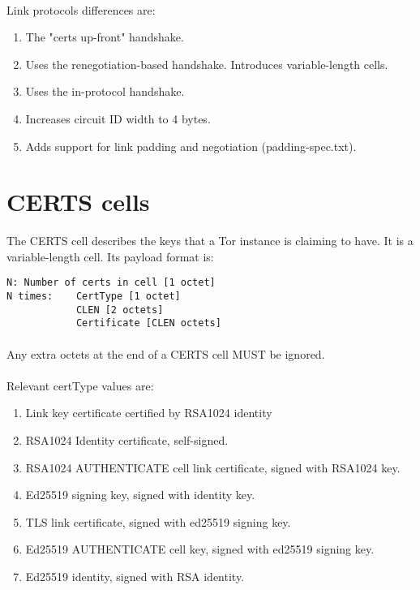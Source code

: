 \paragraph{}
Link protocols differences are:
\begin{enumerate}
    \item The "certs up-front" handshake.
    \item Uses the renegotiation-based handshake. Introduces
          variable-length cells.
    \item Uses the in-protocol handshake.
    \item Increases circuit ID width to 4 bytes.
    \item Adds support for link padding and negotiation (padding-spec.txt).
\end{enumerate}


\section{CERTS cells}
The CERTS cell describes the keys that a Tor instance is claiming
to have. It is a variable-length cell. Its payload format is:

\begin{verbatim}
N: Number of certs in cell [1 octet]
N times:    CertType [1 octet]
            CLEN [2 octets]
            Certificate [CLEN octets]
\end{verbatim}

\paragraph{}
Any extra octets at the end of a CERTS cell MUST be ignored.

\paragraph{}
Relevant certType values are:
\begin{enumerate}
    \item Link key certificate certified by RSA1024 identity
    \item RSA1024 Identity certificate, self-signed.
    \item RSA1024 AUTHENTICATE cell link certificate, signed with RSA1024 key.
    \item Ed25519 signing key, signed with identity key.
    \item TLS link certificate, signed with ed25519 signing key.
    \item Ed25519 AUTHENTICATE cell key, signed with ed25519 signing key.
    \item Ed25519 identity, signed with RSA identity.
\end{enumerate}

